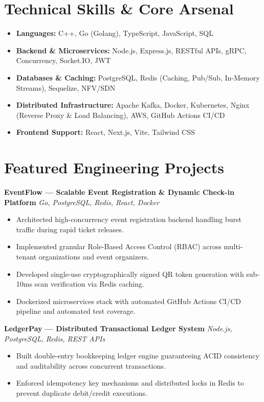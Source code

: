 \documentclass[11pt,a4paper]{article}
\begin{document}
\section{Technical Skills \& Core Arsenal}
\begin{itemize}[leftmargin=*,itemsep=2pt]
    \item \textbf{Languages:} C++, Go (Golang), TypeScript, JavaScript, SQL
    \item \textbf{Backend \& Microservices:} Node.js, Express.js, RESTful APIs, gRPC, Concurrency, Socket.IO, JWT
    \item \textbf{Databases \& Caching:} PostgreSQL, Redis (Caching, Pub/Sub, In-Memory Streams), Sequelize, NFV/SDN
    \item \textbf{Distributed Infrastructure:} Apache Kafka, Docker, Kubernetes, Nginx (Reverse Proxy \& Load Balancing), AWS, GitHub Actions CI/CD
    \item \textbf{Frontend Support:} React, Next.js, Vite, Tailwind CSS
\end{itemize}

\section{Featured Engineering Projects}

\textbf{EventFlow --- Scalable Event Registration \& Dynamic Check-in Platform} \hfill \textit{Go, PostgreSQL, Redis, React, Docker}
\begin{itemize}[leftmargin=*,itemsep=1pt]
    \item Architected high-concurrency event registration backend handling burst traffic during rapid ticket releases.
    \item Implemented granular Role-Based Access Control (RBAC) across multi-tenant organizations and event organizers.
    \item Developed single-use cryptographically signed QR token generation with sub-10ms scan verification via Redis caching.
    \item Dockerized microservices stack with automated GitHub Actions CI/CD pipeline and automated test coverage.
\end{itemize}

\vspace{3pt}

\textbf{LedgerPay --- Distributed Transactional Ledger System} \hfill \textit{Node.js, PostgreSQL, Redis, REST APIs}
\begin{itemize}[leftmargin=*,itemsep=1pt]
    \item Built double-entry bookkeeping ledger engine guaranteeing ACID consistency and auditability across concurrent transactions.
    \item Enforced idempotency key mechanisms and distributed locks in Redis to prevent duplicate debit/credit executions.
\end{itemize}
\end{document}
